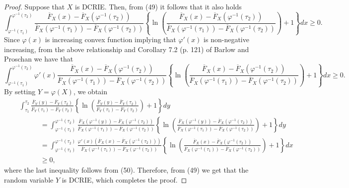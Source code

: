 \documentclass[11pt]{article}
\begin{document}
\begin{proof} Suppose that $X$ is DCRIE. Then, from (49) it follows that it also holds
	\begin{equation*}
			\textstyle \int_{\varphi^{-1}(\tau_1)}^{\varphi^{-1}(\tau_2)} 
			\frac{\overline{F}_X(x) - \overline{F}_X(\varphi^{-1}(\tau_2))}{\overline{F}_X(\varphi^{-1}(\tau_1)) - \overline{F}_X(\varphi^{-1}(\tau_2))}
			\left\{\ln \left(\frac{\overline{F}_X(x) - \overline{F}_X(\varphi^{-1}(\tau_2))}{\overline{F}_X(\varphi^{-1}(\tau_1)) - \overline{F}_X(\varphi^{-1}(\tau_2))}\right) + 1
			\right\} dx \geq 0.
	\end{equation*}
	Since $\varphi(x)$ is increasing convex function implying that $\varphi'(x)$ is non-negative increasing, from the above relationship and Corollary 7.2 (p. 121) of Barlow and Proschan \cite{Barlow1975} we have that
	\begin{equation}
			\textstyle \int_{\varphi^{-1}(\tau_1)}^{\varphi^{-1}(\tau_2)} 
			\varphi'(x) \frac{\overline{F}_X(x) - \overline{F}_X(\varphi^{-1}(\tau_2))}{\overline{F}_X(\varphi^{-1}(\tau_1)) - \overline{F}_X(\varphi^{-1}(\tau_2))}
			\left\{
			\ln \left(
			\frac{\overline{F}_X(x) - \overline{F}_X(\varphi^{-1}(\tau_2))}{\overline{F}_X(\varphi^{-1}(\tau_1)) - \overline{F}_X(\varphi^{-1}(\tau_2))}
			\right) + 1
			\right\} dx \geq 0.
	\end{equation}
	By setting $Y = \varphi(X)$, we obtain
	\begin{align*}
		& \textstyle \quad \int_{\tau_1}^{\tau_2} \frac{\overline{F}_Y(y) - \overline{F}_Y(\tau_2)}{\overline{F}_Y(\tau_1) - \overline{F}_Y(\tau_2)} 
		\left\{ \ln\left( \frac{\overline{F}_Y(y) - \overline{F}_Y(\tau_2)}{\overline{F}_Y(\tau_1) - \overline{F}_Y(\tau_2)} \right) + 1 \right\} dy \\
		& \textstyle \qquad \qquad = \int_{\varphi^{-1}(\tau_1)}^{\varphi^{-1}(\tau_2)} \frac{\overline{F}_X(\varphi^{-1}(y)) - \overline{F}_X(\varphi^{-1}(\tau_2))}{\overline{F}_X(\varphi^{-1}(\tau_1)) - \overline{F}_X(\varphi^{-1}(\tau_2))} 
		\left\{ \ln\left( \frac{\overline{F}_X(\varphi^{-1}(y)) - \overline{F}_X(\varphi^{-1}(\tau_2))}{\overline{F}_X(\varphi^{-1}(\tau_1)) - \overline{F}_X(\varphi^{-1}(\tau_2))} \right) + 1 \right\} dy \\
		& \textstyle \qquad \qquad = \int_{\varphi^{-1}(\tau_1)}^{\varphi^{-1}(\tau_2)} 
		\frac{\varphi'(x)\left( \overline{F}_X(x) - \overline{F}_X(\varphi^{-1}(\tau_2)) \right)}{\overline{F}_X(\varphi^{-1}(\tau_1)) - \overline{F}_X(\varphi^{-1}(\tau_2))} 
		\left\{ \ln\left( \frac{\overline{F}_X(x) - \overline{F}_X(\varphi^{-1}(\tau_2))}{\overline{F}_X(\varphi^{-1}(\tau_1)) - \overline{F}_X(\varphi^{-1}(\tau_2))} \right) + 1 \right\} dx \\
		& \textstyle \qquad \qquad \geq 0,
	\end{align*}
	where the last inequality follows from (50). Therefore, from (49) we get that the random variable $Y$ is DCRIE, which completes the proof.
\end{proof}
\end{document}
